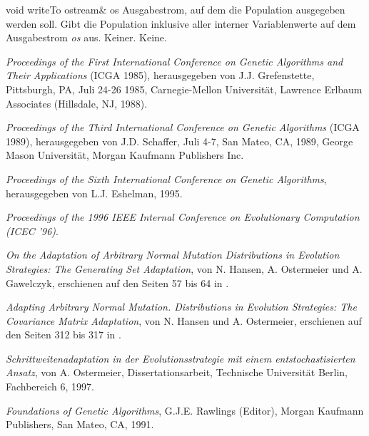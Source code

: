 \documentclass{report}
\begin{document}
\newpage

\setConstInstance
\printMethodWithOneParam
{void}
{writeTo}
{ostream\&}
{os}
{Ausgabestrom, auf dem die Population ausgegeben 
                         werden soll.}
{Gibt die Population inklusive aller interner Variablenwerte auf dem
    Ausgabestrom {\em os} aus.}
{Keiner.}
{Keine.}


\begin{thebibliography}{55}
    
    {\em Proceedings of the First International Conference on Genetic 
    Algorithms and Their Applications} (ICGA 1985), herausgegeben von 
    J.J. Grefenstette, Pittsburgh, PA, Juli 24-26 1985, Carnegie-Mellon 
    Universit\"at, Lawrence Erlbaum Associates (Hillsdale, NJ, 1988).

    {\em Proceedings of the Third International Conference on Genetic 
    Algorithms} (ICGA 1989), herausgegeben von J.D. Schaffer, Juli 4-7, 
    San Mateo, CA, 1989, George Mason Universit\"at, Morgan Kaufmann 
    Publishers Inc.

    {\em Proceedings of the Sixth International Conference on Genetic
    Algorithms}, herausgegeben von L.J. Eshelman, 1995.

    {\em Proceedings of the 1996 IEEE Internal Conference on Evolutionary 
    Computation (ICEC '96)}.

    {\em On the Adaptation of Arbitrary Normal Mutation Distributions
    in Evolution Strategies: The Generating Set Adaptation},
    von N. Hansen, A. Ostermeier und A. Gawelczyk, erschienen auf den
    Seiten 57 bis 64 in \cite{Eshelman95}. 
 
    {\em Adapting Arbitrary Normal Mutation. Distributions in Evolution
    Strategies: The Covariance Matrix Adaptation}, von N. Hansen und A. 
    Ostermeier, erschienen auf den Seiten 312 bis 317 in \cite{ICEC96}.
    
    {\em Schrittweitenadaptation in der Evolutionsstrategie mit einem
    entstochastisierten Ansatz}, von A. Ostermeier, Dissertationsarbeit, 
    Technische Universit\"at Berlin, Fachbereich 6, 1997.

    {\em Foundations of Genetic Algorithms}, G.J.E. Rawlings (Editor),
    Morgan Kaufmann Publishers, San Mateo, CA, 1991.


\end{thebibliography}
\end{document}
